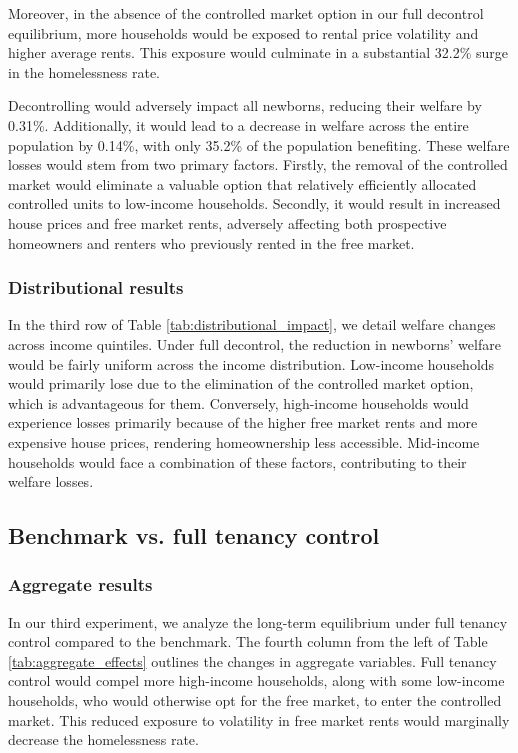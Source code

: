\documentclass[parskip=full]{article}
\begin{document}
Moreover, in the absence of the controlled market option in our full decontrol equilibrium, more households would be exposed to rental price volatility and higher average rents. This exposure would culminate in a substantial 32.2\% surge in the homelessness rate.

Decontrolling would adversely impact all newborns, reducing their welfare by 0.31\%. Additionally, it would lead to a decrease in welfare across the entire population by 0.14\%, with only 35.2\% of the population benefiting. These welfare losses would stem from two primary factors. Firstly, the removal of the controlled market would eliminate a valuable option that relatively efficiently allocated controlled units to low-income households. Secondly, it would result in increased house prices and free market rents, adversely affecting both prospective homeowners and renters who previously rented in the free market.

\subsubsection{Distributional results} 

In the third row of Table \ref{tab:distributional_impact}, we detail welfare changes across income quintiles. Under full decontrol, the reduction in newborns' welfare would be fairly uniform across the income distribution. Low-income households would primarily lose due to the elimination of the controlled market option, which is advantageous for them. Conversely, high-income households would experience losses primarily because of the higher free market rents and more expensive house prices, rendering homeownership less accessible. Mid-income households would face a combination of these factors, contributing to their welfare losses.

\subsection{Benchmark vs. full tenancy control}\label{subsection:full_control}

\subsubsection{Aggregate results}\label{sec:aggregate_results_full_tenancy_control}

In our third experiment, we analyze the long-term equilibrium under full tenancy control compared to the benchmark. The fourth column from the left of Table \ref{tab:aggregate_effects} outlines the changes in aggregate variables. Full tenancy control would compel more high-income households, along with some low-income households, who would otherwise opt for the free market, to enter the controlled market. This reduced exposure to volatility in free market rents would marginally decrease the homelessness rate.
\end{document}
